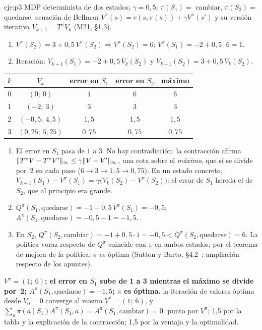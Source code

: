 \begin{solucion}{eje:p3}
\datos MDP determinista de dos estados; $\gamma=0{,}5$; $\pi(S_1)=$ cambiar, $\pi(S_2)=$ quedarse.
\planteamiento ecuación de Bellman $V^{\pi}(s)=r(s,\pi(s))+\gamma V^{\pi}(s')$ y su versión iterativa $V_{k+1}=T^{\pi}V_k$ (M21, §1.3).
\pasos
\begin{enumerate}[label=\arabic*.]
  \item $V^{\pi}(S_2)=3+0{,}5\,V^{\pi}(S_2)\Rightarrow V^{\pi}(S_2)=6$; $V^{\pi}(S_1)=-2+0{,}5\cdot 6=1$.
  \item Iteración: $V_{k+1}(S_1)=-2+0{,}5\,V_k(S_2)$ y $V_{k+1}(S_2)=3+0{,}5\,V_k(S_2)$.
\end{enumerate}
\begin{center}
\small
\begin{tabular}{@{}ccccc@{}}
\toprule
$k$ & $V_k$ & error en $S_1$ & error en $S_2$ & máximo \\
\midrule
0 & $(0;\ 0)$ & $1$ & $6$ & $6$ \\
1 & $(-2;\ 3)$ & $3$ & $3$ & $3$ \\
2 & $(-0{,}5;\ 4{,}5)$ & $1{,}5$ & $1{,}5$ & $1{,}5$ \\
3 & $(0{,}25;\ 5{,}25)$ & $0{,}75$ & $0{,}75$ & $0{,}75$ \\
\bottomrule
\end{tabular}
\end{center}
\begin{enumerate}[label=\arabic*.,resume]
  \item El error en $S_1$ pasa de $1$ a $3$. No hay contradicción: la contracción afirma $\lVert T^{\pi}V-T^{\pi}V'\rVert_\infty\le\gamma\lVert V-V'\rVert_\infty$, una cota sobre el \emph{máximo}, que sí se divide por~2 en cada paso ($6\to 3\to 1{,}5\to 0{,}75$). En un estado concreto, $V_{k+1}(S_1)-V^{\pi}(S_1)=\gamma\bigl(V_k(S_2)-V^{\pi}(S_2)\bigr)$: el error de $S_1$ hereda el de $S_2$, que al principio era grande.
  \item $Q^{\pi}(S_1,\text{quedarse})=-1+0{,}5\,V^{\pi}(S_1)=-0{,}5$; $A^{\pi}(S_1,\text{quedarse})=-0{,}5-1=-1{,}5$.
  \item En $S_2$, $Q^{\pi}(S_2,\text{cambiar})=-1+0{,}5\cdot 1=-0{,}5<Q^{\pi}(S_2,\text{quedarse})=6$. La política voraz respecto de $Q^{\pi}$ coincide con $\pi$ en ambos estados; por el teorema de mejora de la política, $\pi$ es óptima (Sutton y Barto, §4.2~\cite{sb}; ampliación respecto de los apuntes).
\end{enumerate}
\resultado \textbf{$V^{\pi}=(1;\ 6)$; el error en $S_1$ sube de 1 a 3 mientras el máximo se divide por~2; $A^{\pi}(S_1,\text{quedarse})=-1{,}5$; $\pi$ es óptima.}
\comprobacion la iteración de valores óptima desde $V_0=0$ converge al mismo $V^{\ast}=(1;\ 6)$, y $\sum_a\pi(a\mid S_1)A^{\pi}(S_1,a)=A^{\pi}(S_1,\text{cambiar})=0$.
 punto por $V^{\pi}$; 1,5 por la tabla y la explicación de la contracción; 1,5 por la ventaja y la optimalidad.


\end{solucion}
